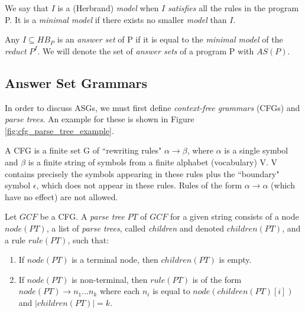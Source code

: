 \begin{definition}
We say that $I$ is a (Herbrand) \textit{model} when $I$ \textit{satisfies} all the rules in the program P. It is a \textit{minimal model} if there exists no smaller \textit{model} than $I$.
\end{definition}

\begin{definition}
Any $I \subseteq HB_P$ is an \textit{answer set} of P if it is equal to the \textit{minimal model}  of the \textit{reduct} $P^I$. We will denote the set of \textit{answer sets} of a program P with $AS(P)$. 
\end{definition}

\subsection{Answer Set Grammars}

In order to discuss ASGs, we must first define \textit{context-free grammars} (CFGs) and \textit{parse trees}. An example for these is shown in Figure \ref{fig:cfg_parse_tree_example}.

\begin{definition}
A CFG is a finite set G of ``rewriting rules" $\alpha \to \beta$, where $\alpha$ is a single symbol and $\beta$ is a finite string of symbols from a finite alphabet (vocabulary) V. V contains precisely the symbols appearing in these rules plus the ``boundary" symbol $\epsilon$, which does not appear in these rules. Rules of the form $\alpha \to \alpha$ (which have no effect) are not allowed.
\end{definition}

\begin{definition}
Let $GCF$ be a CFG. A \textit{parse tree} $PT$ of $GCF$ for a given string consists of a node $node(PT)$, a list of \textit{parse trees}, called \textit{children} and denoted $children(PT)$, and a rule $rule(PT)$, such that:
\begin{enumerate}[nolistsep]
\item If $node(PT)$ is a terminal node, then $children(PT)$ is empty.
\item If $node(PT)$ is non-terminal, then $rule(PT)$ is of the form $node(PT) \to n_1 ... n_k$ where each $n_i$ is equal to $node(children(PT)[i])$ and $|children(PT)| = k$.
\end{enumerate}
\end{definition}

